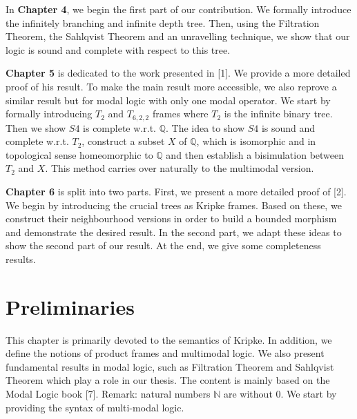 \documentclass[12pt, a4paper]{scrartcl}
\begin{document}
In \textbf{Chapter 4}, we begin the first part of our contribution. We formally introduce the infinitely branching and infinite depth tree. Then, using the Filtration Theorem, the Sahlqvist Theorem 
and an unravelling technique, we show that our logic is sound and complete with respect to this tree. \newline

\textbf{Chapter 5} is dedicated to the work presented in [1]. We provide a more detailed 
proof of his result. To make the main result more accessible, we also reprove a similar result but for modal logic with only one modal operator.
We start by formally introducing $T_2$ and $T_{6,2,2}$ frames where $T_2$ is the infinite binary tree. Then we show $S4$ is complete w.r.t. $\mathbb{Q}$.
The idea to show $S4$ is sound and complete w.r.t. $T_2$, construct a subset $X$ of $\mathbb{Q}$, which is isomorphic and in topological sense homeomorphic to $\mathbb{Q}$ and 
then establish a bisimulation between $T_2$ and $X$. This method carries over naturally to the multimodal version. \newline

\textbf{Chapter 6} is split into two parts. First, we present a more detailed proof of [2]. We begin by introducing the crucial trees as Kripke frames.
Based on these, we construct their neighbourhood versions in order to build a bounded morphism and demonstrate the desired result. In the second part, we adapt these ideas
to show the second part of our result. At the end, we give some completeness results.






 \clearpage



\section{Preliminaries}
This chapter is primarily devoted to the semantics of Kripke.
In addition, we define the notions of product frames and multimodal logic. We also present fundamental results in modal logic, 
such as Filtration Theorem and Sahlqvist Theorem which play a role in our thesis. The content is mainly based on the Modal Logic book [7]. Remark: natural numbers $\mathbb{N}$ are without 0. \newline
\newline
We start by providing the syntax of multi-modal logic.
\end{document}
